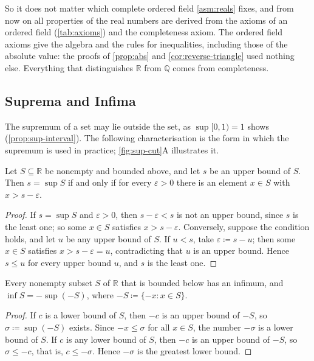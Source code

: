 So it does not matter which complete ordered field \cref{asm:reals} fixes, and from now on all properties of the real numbers are derived from the axioms of an ordered field (\cref{tab:axioms}) and the completeness axiom. The ordered field axioms give the algebra and the rules for inequalities, including those of the absolute value: the proofs of \cref{prop:abs} and \cref{cor:reverse-triangle} used nothing else. Everything that distinguishes $\mathbb R$ from $\mathbb Q$ comes from completeness.

\subsection{Suprema and Infima}

The supremum of a set may lie outside the set, as $\sup[0,1)=1$ shows (\cref{prop:sup-interval}). The following characterisation is the form in which the supremum is used in practice; \cref{fig:sup-cut}A illustrates it.

\begin{lemma}
\label{lem:sup-approx}
Let $S\subseteq\mathbb R$ be nonempty and bounded above, and let $s$ be an upper bound of $S$. Then $s=\sup S$ if and only if for every $\varepsilon>0$ there is an element $x\in S$ with $x>s-\varepsilon$.
\end{lemma}

\begin{proof}
If $s=\sup S$ and $\varepsilon>0$, then $s-\varepsilon<s$ is not an upper bound, since $s$ is the least one; so some $x\in S$ satisfies $x>s-\varepsilon$. Conversely, suppose the condition holds, and let $u$ be any upper bound of $S$. If $u<s$, take $\varepsilon\coloneqq s-u$; then some $x\in S$ satisfies $x>s-\varepsilon=u$, contradicting that $u$ is an upper bound. Hence $s\le u$ for every upper bound $u$, and $s$ is the least one.
\end{proof}

\begin{proposition}
\label{prop:inf}
Every nonempty subset $S$ of $\mathbb R$ that is bounded below has an infimum, and $\inf S=-\sup(-S)$, where $-S\coloneqq\{-x: x\in S\}$.
\end{proposition}

\begin{proof}
If $c$ is a lower bound of $S$, then $-c$ is an upper bound of $-S$, so $\sigma\coloneqq\sup(-S)$ exists. Since $-x\le\sigma$ for all $x\in S$, the number $-\sigma$ is a lower bound of $S$. If $c$ is any lower bound of $S$, then $-c$ is an upper bound of $-S$, so $\sigma\le-c$, that is, $c\le-\sigma$. Hence $-\sigma$ is the greatest lower bound.
\end{proof}


